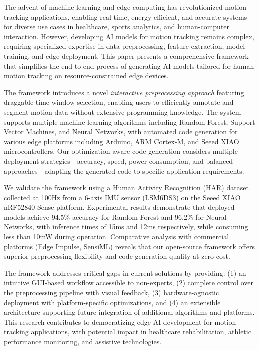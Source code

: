 The advent of machine learning and edge computing has revolutionized motion tracking applications, enabling real-time, energy-efficient, and accurate systems for diverse use cases in healthcare, sports analytics, and human-computer interaction. However, developing AI models for motion tracking remains complex, requiring specialized expertise in data preprocessing, feature extraction, model training, and edge deployment. This paper presents a comprehensive framework that simplifies the end-to-end process of generating AI models tailored for human motion tracking on resource-constrained edge devices.

The framework introduces a novel \textit{interactive preprocessing approach} featuring draggable time window selection, enabling users to efficiently annotate and segment motion data without extensive programming knowledge. The system supports multiple machine learning algorithms including Random Forest, Support Vector Machines, and Neural Networks, with automated code generation for various edge platforms including Arduino, ARM Cortex-M, and Seeed XIAO microcontrollers. Our optimization-aware code generation considers multiple deployment strategies—accuracy, speed, power consumption, and balanced approaches—adapting the generated code to specific application requirements.

We validate the framework using a Human Activity Recognition (HAR) dataset collected at 100Hz from a 6-axis IMU sensor (LSM6DS3) on the Seeed XIAO nRF52840 Sense platform. Experimental results demonstrate that deployed models achieve 94.5\% accuracy for Random Forest and 96.2\% for Neural Networks, with inference times of 15ms and 12ms respectively, while consuming less than 10mW during operation. Comparative analysis with commercial platforms (Edge Impulse, SensiML) reveals that our open-source framework offers superior preprocessing flexibility and code generation quality at zero cost.

The framework addresses critical gaps in current solutions by providing: (1) an intuitive GUI-based workflow accessible to non-experts, (2) complete control over the preprocessing pipeline with visual feedback, (3) hardware-agnostic deployment with platform-specific optimizations, and (4) an extensible architecture supporting future integration of additional algorithms and platforms. This research contributes to democratizing edge AI development for motion tracking applications, with potential impact in healthcare rehabilitation, athletic performance monitoring, and assistive technologies.